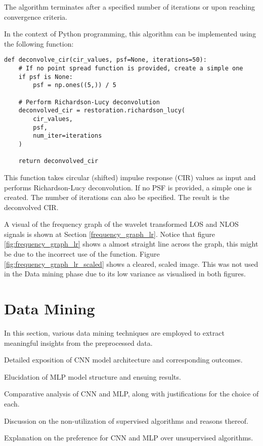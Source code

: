 \documentclass[
	article, %
	11pt, %
	draft, %
]{CSUniSchoolLabReport}
\begin{document}
The algorithm terminates after a specified number of iterations or upon reaching convergence criteria.

In the context of Python programming, this algorithm can be implemented using the following function:

\begin{verbatim}
def deconvolve_cir(cir_values, psf=None, iterations=50):
    # If no point spread function is provided, create a simple one
    if psf is None:
        psf = np.ones((5,)) / 5

    # Perform Richardson-Lucy deconvolution
    deconvolved_cir = restoration.richardson_lucy(
        cir_values, 
        psf, 
        num_iter=iterations
    )

    return deconvolved_cir
\end{verbatim}

This function takes circular (shifted) impulse response (CIR) values as input and performs Richardson-Lucy deconvolution. If no PSF is provided, a simple one is created. The number of iterations can also be specified. The result is the deconvolved CIR.



A visual of the frequency graph of the wavelet transformed LOS and NLOS signals is shown at Section \ref{frequency_graph_lr}. Notice that figure \ref{fig:frequency_graph_lr} shows a almost straight line across the graph, this might be due to the incorrect use of the function. Figure \ref{fig:frequency_graph_lr_scaled} shows a cleared, scaled image. This was not used in the Data mining phase due to its low variance as visualised in both figures.



\section{Data Mining}\label{data_mining}

In this section, various data mining techniques are employed to extract meaningful insights from the preprocessed data.

\begin{description}[style=nextline]
    \item[Convolution Neural Network (CNN):] Detailed exposition of CNN model architecture and corresponding outcomes.
    \item[Multilayer Perceptron (MLP):] Elucidation of MLP model structure and ensuing results.
    \item[Comparison Between CNN and MLP:] Comparative analysis of CNN and MLP, along with justifications for the choice of each.
    \item[Supervised Machine Learning Algorithms:] Discussion on the non-utilization of supervised algorithms and reasons thereof.
    \item[Unsupervised Machine Learning Algorithms:] Explanation on the preference for CNN and MLP over unsupervised algorithms.
\end{description}
\end{document}
